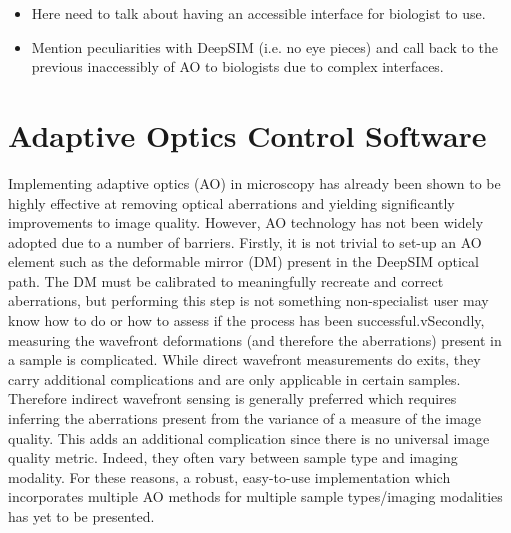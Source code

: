 	\begin{itemize}
		\item Here need to talk about having an accessible interface for biologist to use.
		\item Mention peculiarities with DeepSIM (i.e. no eye pieces) and call back to the previous inaccessibly of AO to biologists due to complex interfaces.
	\end{itemize}

\section{Adaptive Optics Control Software}
\label{sec:AOtools}

Implementing adaptive optics (AO) in microscopy has already been shown to be highly effective at removing optical aberrations and yielding significantly improvements to image quality.\cite{booth2014adaptive,girkin2009adaptive} However, AO technology has not been widely adopted due to a number of barriers. Firstly, it is not trivial to set-up an AO element such as the deformable mirror (DM) present in the DeepSIM optical path. The DM must be calibrated to meaningfully recreate and correct aberrations, but performing this step is not something non-specialist user may know how to do or how to assess if the process has been successful.vSecondly, measuring the wavefront deformations (and therefore the aberrations) present in a sample is complicated. While direct wavefront measurements do exits, they carry additional complications and are only applicable in certain samples.\cite{wang2014rapid,wang2015direct} Therefore indirect wavefront sensing is generally preferred which requires inferring the aberrations present from the variance of a measure of the image quality.\cite{rodriguez2018adaptive} This adds an additional complication since there is no universal image quality metric. Indeed, they often vary between sample type and imaging modality.\cite{burke2015adaptive,booth2002adaptive,fienup2003aberration,debarre2008adaptive} For these reasons, a robust, easy-to-use implementation which incorporates multiple AO methods for multiple sample types/imaging modalities has yet to be presented.\cite{ji2017adaptive}

